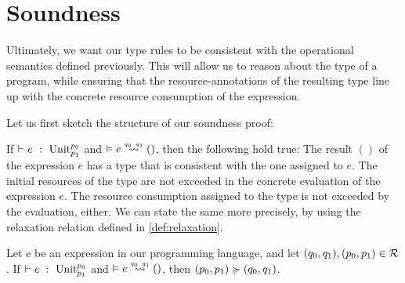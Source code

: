 \section{Soundness}
Ultimately, we want our type rules to be consistent with the operational semantics defined previously. This will allow us to reason about the type of a program, while ensuring that the resource-annotations of the resulting type line up with the concrete resource consumption of the expression.

Let us first sketch the structure of our soundness proof:

If \(\vdash e~:~\text{Unit} ^{p_0}_{p_1}\) and \(\evals{}{e}{()}{q_0}{q_1}\), then the following hold true:
The result \(()\) of the expression \(e\) has a type that is consistent with the one assigned to \(e\). The initial resources of the type are not exceeded in the concrete evaluation of the expression \(e\). The resource consumption assigned to the type is not exceeded by the evaluation, either. We can state the same more precisely, by using the relaxation relation defined in \cref{def:relaxation}.

\begin{theorem}\label{thm:soundness-let-tick}
   Let e be an expression in our programming language, and let \((q_0, q_1), (p_0, p_1) \in \mathcal{R}\). 
   \center If \(\vdash e~:~\text{Unit} ^{p_0}_{p_1}\) and \(\evals{}{e}{()}{q_0}{q_1}\), then \((p_0, p_1) \succcurlyeq (q_0, q_1)\).
\end{theorem}

